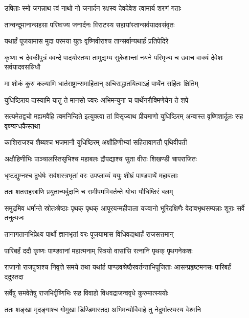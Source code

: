 \twolineshloka
{उषिताः स्मो जगन्नाथ त्वं नाथो नो जनार्दन}
{रक्षस्व देवदेवेश त्वामार्य शरणं गताः}



\twolineshloka
{तान्वन्दूमानान्सहसा परिष्वज्य जनार्दनः}
{विराटस्य सहायांस्तान्सर्वयादवसंवृतः}


\twolineshloka
{यथार्हं पूजयामास मुदा परमया युतः}
{वृष्णिवीराश्च तान्सर्वान्यथार्हं प्रतिपेदिरे}


\threelineshloka
{कृष्णा च देवकीपुत्रं ववन्दे पादयोस्तथा}
{तामुद्यम्य सुकेशान्तां नयने परिमृज्य च}
{उवाच वाक्यं देवेशः सर्वयादवसन्निधौ}


\twolineshloka
{मा शोकं कुरु कल्याणि धार्तराष्ट्रान्समाहितान्}
{अचिराद्धातयित्वाऽहं पार्थेन सहितः क्षितिम्}


\twolineshloka
{युधिष्ठिराय दास्यामि यातु ते मानसो ज्वरः}
{अभिमन्युना च पार्थेनरौक्मिणेयेन ते शपे}


\threelineshloka
{सत्यमेतद्वचो मह्यमवैहि त्वमनिन्दिते}
{इत्युक्त्वा तां विसृज्याथ प्रीयमाणो युधिष्ठिरम्}
{अन्वास्त वृष्णिशार्दूलः सह वृष्ण्यन्धकैस्तथा}


\twolineshloka
{काशिराजश्च शैब्यश्च भजमानौ युधिष्ठिरम्}
{अक्षौहिणीभ्यां सहितावागतौ पृथिवीपती}


\twolineshloka
{अक्षौहिणीभिः पाञ्चालस्तिसृभिश्च महाबलः}
{द्रौपद्याश्च सुता वीराः शिखण्डी चापराजितः}


\twolineshloka
{धृष्टद्युम्नश्च दुर्धर्षः सर्वशस्त्रभृतां वरः}
{उपप्लाव्यं ययुः शीघ्रं पाण्डवार्थे महाबलाः}


\twolineshloka
{ततः शतसहस्राणि प्रयुतान्यर्बुदानि च}
{समीपमभिवर्तन्ते योधा यौधिष्ठिरं बलम्}


\threelineshloka
{समुद्रमिव धर्मान्ते स्रोतःश्रेष्ठाः पृथक् पृथक्}
{आपूरयन्महीपाला यज्वानो भूरिदक्षिणैः}
{वेदावभृथसम्पन्नाः शूराः सर्वे तनुत्यजः}


\twolineshloka
{तानागतानभिप्रेक्ष्य पार्थो ज्ञानभृतां वरः}
{पूजयामास विधिवद्यथार्हं राजसत्तमान्}


\twolineshloka
{पारिबर्हं ददौ कृष्णः पाण्डवानां महात्मनाम्}
{स्त्रियो वासांसि रत्नानि पृथक् पृथगनेकशः}


\threelineshloka
{राजानो राजपुत्राश्च निवृत्ते समये तथा}
{यथांर्ह पाण्डवश्रेष्ठैरवर्तन्ताभिपूजिताः}
{आसन्प्रहृष्टमनसः पारिबर्हं ददुस्तदा}


\twolineshloka
{सर्वेषु समवेतेषु राजभिर्वृष्णिभिः सह}
{विवाहो विधवद्राजन्ववृधे कुरुमात्स्ययोः}


\twolineshloka
{ततः शङ्खा मृदङ्गाश्च गोमुखा डिण्डिमास्तदा}
{अभिमन्योर्विवाहे तु नेदुर्मात्स्यस्य वेश्मनि}


